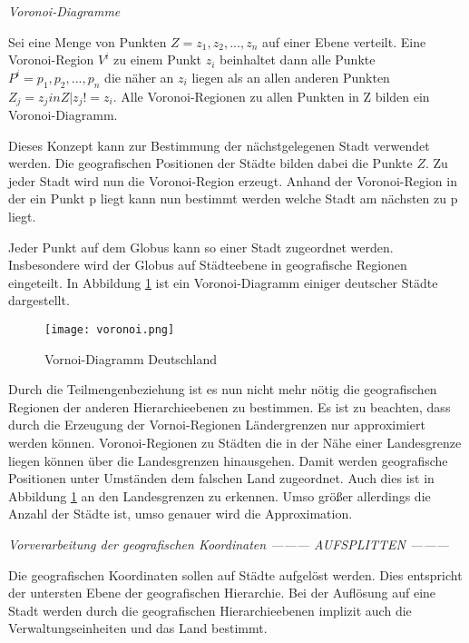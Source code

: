 				\textit{Voronoi-Diagramme} 

					Sei eine Menge von Punkten $Z = {z_1,z_2,...,z_n}$ auf einer Ebene verteilt.
					Eine Voronoi-Region $V^i$ zu einem Punkt $z_i$ beinhaltet dann alle Punkte $P^i={p_1,p_2,...,p_n}$ die näher an $z_i$ liegen als an allen anderen Punkten $Z_j={z_j in Z|z_j!=z_i}$.
					Alle Voronoi-Regionen zu allen Punkten in Z bilden ein Voronoi-Diagramm.

					Dieses Konzept kann zur Bestimmung der nächstgelegenen Stadt verwendet werden. 
					Die geografischen Positionen der Städte bilden dabei die Punkte $Z$.
					Zu jeder Stadt wird nun die Voronoi-Region erzeugt. 
					Anhand der Voronoi-Region in der ein Punkt p liegt kann nun bestimmt werden welche Stadt am nächsten zu p liegt.

					Jeder Punkt auf dem Globus kann so einer Stadt zugeordnet werden.
					Insbesondere wird der Globus auf Städteebene in geografische Regionen eingeteilt.
					In Abbildung \ref{img:voronoi} ist ein Voronoi-Diagramm einiger deutscher Städte dargestellt.

					\begin{figure}[h!]
					\begin{center}
					\texttt{[image: voronoi.png]}
					\caption{Vornoi-Diagramm Deutschland}
					\label{img:voronoi}
					\end{center}
					\end{figure}	

					Durch die Teilmengenbeziehung ist es nun nicht mehr nötig die geografischen Regionen der anderen Hierarchieebenen zu bestimmen.
					Es ist zu beachten, dass durch die Erzeugung der Vornoi-Regionen Ländergrenzen nur approximiert werden können. 
					Voronoi-Regionen zu Städten die in der Nähe einer Landesgrenze liegen können über die Landesgrenzen hinausgehen. 
					Damit werden geografische Positionen unter Umständen dem falschen Land zugeordnet.
					Auch dies ist in Abbildung \ref{img:voronoi} an den Landesgrenzen zu erkennen. 
					Umso größer allerdings die Anzahl der Städte ist, umso genauer wird die Approximation. 

				\textit{Vorverarbeitung der geografischen Koordinaten --------- AUFSPLITTEN ---------}

					Die geografischen Koordinaten sollen auf Städte aufgelöst werden.
					Dies entspricht der untersten Ebene der geografischen Hierarchie.
					Bei der Auflösung auf eine Stadt werden durch die geografischen Hierarchieebenen implizit auch die Verwaltungseinheiten und das Land bestimmt.

